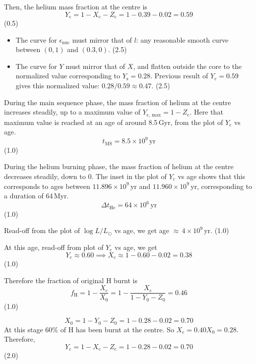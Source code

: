 \begin{description}
  Then, the helium mass fraction at the centre is
  \[
    Y_{\mathrm{c}} = 1 - X_{\mathrm{c}} - Z_{\mathrm{c}}
    = 1 - 0.39 - 0.02 = 0.59
  \]
  \hfill(0.5)

\item[(T11.1c)]\mbox{}
  \begin{itemize}
  \item The curve for $\epsilon_{\mathrm{nuc}}$ must mirror that of $l$: any
    reasonable smooth curve between $(0,1)$ and $(0.3,0)$. \hfill(2.5)
  \item The curve for $Y$ must mirror that of $X$, and flatten outside the
    core to the normalized value corresponding to $Y_{\mathrm{s}} = 0.28$.
    Previous result of $Y_{\mathrm{c}} = 0.59$ gives this normalized value:
    $0.28/0.59 \approx 0.47$. \hfill(2.5)
  \end{itemize}

\item[(T11.2a)] During the main sequence phase, the mass fraction of helium at
  the centre increases steadily, up to a maximum value of
  $Y_{\mathrm{c,\,max}} = 1 - Z_{\mathrm{c}}$. Here that maximum value is
  reached at an age of around 8.5\,Gyr, from the plot of $Y_{\mathrm{c}}$ vs
  age.
  \[
    t_{\mathrm{MS}} = 8.5 \times 10^{9}\,\mathrm{yr}
  \]
  \hfill(1.0)

\item[(T11.2b)] During the helium burning phase, the mass fraction of helium
  at the centre decreases steadily, down to 0. The inset in the plot of
  $Y_{\mathrm{c}}$ vs age shows that this corresponds to ages between
  $11.896 \times 10^{9}$\,yr and $11.960 \times 10^{9}$\,yr, corresponding to
  a duration of 64\,Myr.
  \[
    \Delta t_{\mathrm{He}} = 64 \times 10^{6}\,\mathrm{yr}
  \]
  \hfill(1.0)

\item[(T11.2c)] Read-off from the plot of $\log L/L_\odot$ vs age, we get age
  ${\approx}\,4 \times 10^{9}$\,yr. \hfill(1.0)

  At this age, read-off from plot of $Y_{\mathrm{c}}$ vs age, we get
  \[
    Y_{\mathrm{c}} \approx 0.60 \implies
    X_{\mathrm{c}} \approx 1 - 0.60 - 0.02 = 0.38
  \]
  \hfill(1.0)

  Therefore the fraction of original H burnt is
  \[
    f_{\mathrm{H}} = 1 - \frac{X_{\mathrm{c}}}{X_0}
    = 1 - \frac{X_{\mathrm{c}}}{1 - Y_0 - Z_0} = 0.46
  \]
  \hfill(1.0)

\item[(T11.2d)]
  \[
    X_0 = 1 - Y_0 - Z_0 = 1 - 0.28 - 0.02 = 0.70
  \]
  At this stage 60\% of H has been burnt at the centre. So
  $X_{\mathrm{c}} = 0.40 X_0 = 0.28$. Therefore,
  \[
    Y_{\mathrm{c}} = 1 - X_{\mathrm{c}} - Z_{\mathrm{c}}
    = 1 - 0.28 - 0.02 = 0.70
  \]
  \hfill(2.0)


\end{description}
